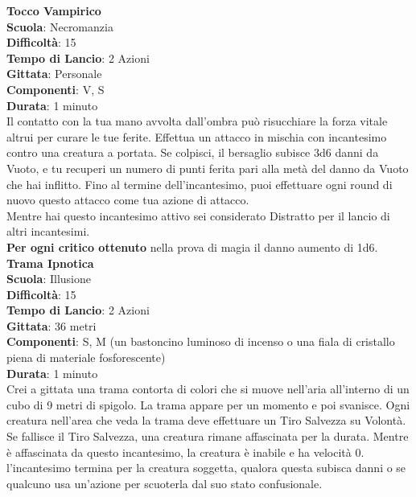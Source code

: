 \begin{multicols}{2}
\medskip\textbf{Tocco Vampirico}\\
\textbf{Scuola}: Necromanzia\\
\textbf{Difficoltà}:  15\\
\textbf{Tempo di Lancio}: 2 Azioni\\
\textbf{Gittata}: Personale\\
\textbf{Componenti}: V, S\\
\textbf{Durata}: 1 minuto \\
Il contatto con la tua mano avvolta dall'ombra può risucchiare la forza vitale altrui per curare le tue ferite. Effettua un attacco in mischia con incantesimo contro una creatura a portata. Se colpisci, il bersaglio subisce 3d6 danni da Vuoto, e tu recuperi un numero di punti ferita pari alla metà del danno da Vuoto che hai inflitto. Fino al termine dell'incantesimo, puoi effettuare ogni round di nuovo questo attacco come tua azione di attacco.\\
Mentre hai questo incantesimo attivo sei considerato Distratto per il lancio di altri incantesimi.\\
\textbf{Per ogni critico ottenuto} nella prova di magia il danno aumento di 1d6.\\

\medskip\textbf{Trama Ipnotica}\\
\textbf{Scuola}: Illusione\\
\textbf{Difficoltà}:  15\\
\textbf{Tempo di Lancio}: 2 Azioni\\
\textbf{Gittata}: 36 metri\\
\textbf{Componenti}: S, M (un bastoncino luminoso di incenso o una fiala di cristallo piena di materiale fosforescente)\\
\textbf{Durata}: 1 minuto\\
Crei a gittata una trama contorta di colori che si muove nell'aria all'interno di un cubo di 9 metri di spigolo. La trama appare per un momento e poi svanisce. Ogni creatura nell'area che veda la trama deve effettuare un Tiro Salvezza su Volontà. Se fallisce il Tiro Salvezza, una creatura rimane affascinata per la durata. Mentre è affascinata da questo incantesimo, la creatura è inabile e ha velocità 0. l'incantesimo termina per la creatura soggetta, qualora questa subisca danni o se qualcuno usa un'azione per scuoterla dal suo stato confusionale.


\end{multicols}
